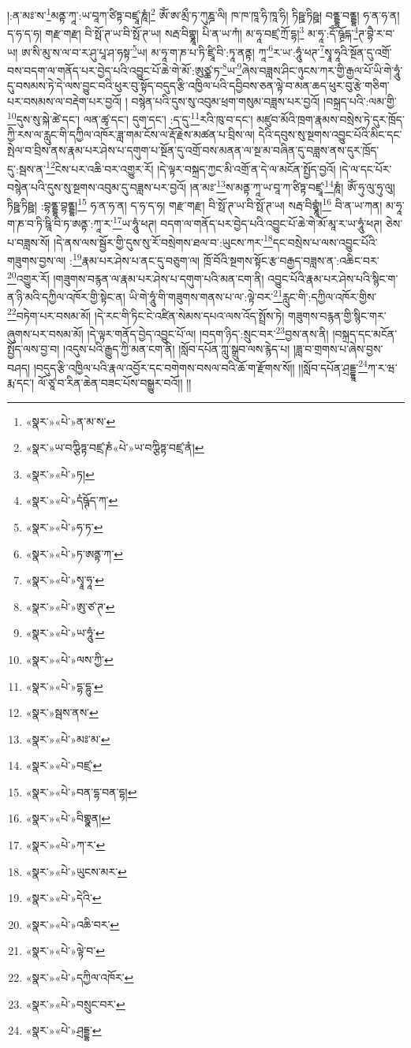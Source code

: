 །:ན་མཿ་ས་\footnote{«སྣར་»«པེ་»ན་མ་ས་}མནྟ་ཀཱ་:ཡ་བཱཀ་ཙིཏྟ་བཛྲཱ་ཎཱཾ།\footnote{«སྣར་»ཡ་བཀྩིཏྟ་བཛྲ་ཎཾ«པེ་»ཡ་བཀྩིཏྟ་བཛྲ་ནཾ།} ཨོཾ་ཨ་མྲྀ་ཏ་ཀུཎྜ་ལི། ཁ་ཁ་ཁཱ་ཧི་ཁཱ་ཧི། ཏིཥྛ་ཏིཥྛ། བནྡྷ་བནྡྷ། ཧ་ན་ཧ་ན། ད་ཧ་ད་ཧ། གརྫ་གརྫ། བི་སྥོ་ཊ་ཡ་བི་སྥོ་ཊ་ཡ། སརྦ་བིགྷྣཱ། པི་ན་ཡ་ཀཾ། མ་ཧཱ་བཛྲ་ཀྲོ་དྷ།\footnote{«སྣར་»«པེ་»ཏ།} མ་ཧཱ་:དོཾ་ཥྚྲོདྐ་\footnote{«སྣར་»«པེ་»དཾཥྚོད་ཀ་}ཊ་བྷཻ་ར་བ་ཡ། ཨ་སི་མུ་ས་ལ་བ་ར་ཤུ་པཱ་ཤ་ཧསྟ་\footnote{«སྣར་»«པེ་»ཧ་ཏ་}ཡ། མ་ཧཱ་ག་ཎ་པ་ཏི་ཛྲཱི་བི་:ཏཱ་ནནྟ། ཀཱ་\footnote{«སྣར་»«པེ་»ཏ་ཨནྟ་ཀ་}ར་ཡ་:ཧཱུཾ་ཕཊ་\footnote{«སྣར་»«པེ་»སྭཱ་ཧཱ་}སྭཱ་ཧཱའི་སྔོན་དུ་འགྲོ་བས་བདག་ལ་གནོད་པར་བྱེད་པའི་འབྱུང་པོ་ཆེ་གེ་མོ་:ཨུཙྪ་ཏ་\footnote{«སྣར་»«པེ་»ཨུ་ཙ་ཊ་}ཡ་\footnote{«སྣར་»«པེ་»ཡ་ཧཱུཾ་}ཞེས་བཟླས་ཤིང་ཉུངས་ཀར་གྱི་རྒྱལ་པོ་ཡི་གེ་ཧཱུཾ་དུ་བསམས་ཏེ་དེ་ལས་བྱུང་བའི་ཕུར་བུ་སྟོད་བདུད་རྩི་འཁྱིལ་པའི་དབྱིབས་ཅན་ལྟེ་བ་མན་ཆད་ཕུར་བུ་རྩེ་གཅིག་པར་བསམས་ལ་བརྡེག་པར་བྱའོ། །
བསྙེན་པའི་དུས་སུ་འབུམ་ཕྲག་གསུམ་བཟླས་པར་བྱའོ། །བསྐྲད་པའི་:ལམ་གྱི་\footnote{«སྣར་»«པེ་»ལས་ཀྱི་}དུས་སུ་སྐེ་ཚེ་དང་། ལན་ཚྭ་དང་། དུག་དང་། :ད་དུ་\footnote{«སྣར་»«པེ་»དྷ་དྷུ་}རའི་ཁུ་བ་དང་། མཛུབ་མོའི་ཁྲག་རྣམས་བསྲེས་ཏེ་དུར་ཁྲོད་ཀྱི་རས་ལ་རླུང་གི་དཀྱིལ་འཁོར་ཟླ་གམ་ངོས་ལ་རྡོ་རྗེས་མཚན་པ་བྲིས་ལ། དེའི་དབུས་སུ་སྔགས་འབྱུང་པོའི་མིང་དང་སྤེལ་བ་བྲིས་ནས་རྣམ་པར་ཤེས་པ་དགུག་པ་སྔོན་དུ་འགྲོ་བས་མནན་ལ་སྔ་མ་བཞིན་དུ་བཟླས་ནས་དུར་ཁྲོད་དུ་:སྦས་ན་\footnote{«སྣར་»སྦས་ནས་}ངེས་པར་འཆི་བར་འགྱུར་རོ། །དེ་ལྟར་བསྐྲད་ཀྱང་མི་འགྲོ་ན་དེ་ལ་མངོན་སྤྱོད་བྱའོ། །དེ་ལ་དང་པོར་བསྙེན་པའི་དུས་སུ་སྔགས་འབུམ་དུ་བཟླས་པར་བྱའོ། །ན་མཿ་\footnote{«སྣར་»«པེ་»མཿ་མ་}ས་མནྟ་ཀཱ་ཡ་བཱ་ཀ་ཙིཏྟ་བཛྲཱ་\footnote{«སྣར་»«པེ་»བཛྲ་}ཎཱཾ། ཨོཾ་ཧུ་ལུ་ཧུ་ལུ། ཏིཥྛ་ཏིཥྛ། :བྷནྡྷ་བྷནྡྷ།\footnote{«སྣར་»«པེ་»བན་དྷ་བན་དྷ།} ཧ་ན་ཧ་ན། ད་ཧ་ད་ཧ། གརྫ་གརྫ། བི་སྥོ་ཊ་ཡ་བི་སྥོ་ཊ་ཡ། སརྦ་བིགྷྣཱཾ།\footnote{«སྣར་»«པེ་»བིགྷྣན།} བི་ན་ཡ་ཀན། མ་ཧཱ་ག་ཎ་བ་ཏི་ཋཱི་བི་ཏ་ཨནྟ་:ཀཱ་ར་\footnote{«སྣར་»«པེ་»ཀ་ར་}ཡ་ཧཱུཾ་ཕཊ། བདག་ལ་གནོད་པར་བྱེད་པའི་འབྱུང་པོ་ཆེ་གེ་མོ་མཱ་ར་ཡ་ཧཱུཾ་ཕཊ། ཅེས་པ་བཟླས་སོ། །དེ་ནས་ལས་སྦྱོར་གྱི་དུས་སུ་རོ་བསྲེགས་ཐལ་བ་:ཡུངས་ཀར་\footnote{«སྣར་»«པེ་»ཡུངས་མར་}དང་བསྲེས་པ་ལས་འབྱུང་པོའི་གཟུགས་བྱས་ལ། :\footnote{«སྣར་»«པེ་»དེའི་}རྣམ་པར་ཤེས་པ་ནང་དུ་བཅུག་ལ། ཁྲོ་བོའི་སྔགས་སྟོང་རྩ་བརྒྱད་བཟླས་ན་:འཆིང་བར་\footnote{«སྣར་»«པེ་»འཆི་བར་}འགྱུར་རོ། །གཟུགས་བརྙན་ལ་རྣམ་པར་ཤེས་པ་དགུག་པའི་མན་ངག་ནི། འབྱུང་པོའི་རྣམ་པར་ཤེས་པའི་སྙིང་ག་ན་ཉི་མའི་དཀྱིལ་འཁོར་གྱི་སྟེང་ན། ཡི་གེ་ཧཱུཾ་གི་གཟུགས་གནས་པ་ལ་:ལྟེ་བར་\footnote{«སྣར་»«པེ་»ལྟེ་བ་}རླུང་གི་:དཀྱིལ་འཁོར་གྱིས་\footnote{«སྣར་»«པེ་»དཀྱིལ་འཁོར་}བཏེག་པར་བསམ་མོ། །དེ་རང་གི་ཏིང་ངེ་འཛིན་སེམས་དཔའ་ལས་འོད་སྤྲོས་ཏེ། གཟུགས་བརྙན་གྱི་སྙིང་གར་ཞུགས་པར་བསམ་མོ། །དེ་ལྟར་གནོད་བྱེད་འབྱུང་པོ་ལ། །བདག་ཉིད་:སྲུང་བར་\footnote{«སྣར་»«པེ་»བསྲུང་བར་}བྱས་ནས་ནི། །བསྐྲད་དང་མངོན་སྤྱོད་ལས་བྱ་བ། །འདུས་པའི་རྒྱུད་ཀྱི་མན་ངག་ནི། །སློབ་དཔོན་ཀླུ་སྒྲུབ་ལས་རྙེད་པ། །ཟླ་བ་གྲགས་པ་ཞེས་བྱས་བཤད། །བདུད་རྩི་འཁྱིལ་པའི་རྣལ་འབྱོར་དང་བགེགས་བསལ་བའི་ཆོ་ག་རྫོགས་སོ།། །།སློབ་དཔོན་ཤྲདྡྷཱ་\footnote{«སྣར་»«པེ་»ཤྲདྡྷ་}ཀ་ར་ཝ་རྨ་དང་། ལོ་ཙཱ་བ་རིན་ཆེན་བཟང་པོས་བསྒྱུར་བའོ།། །།